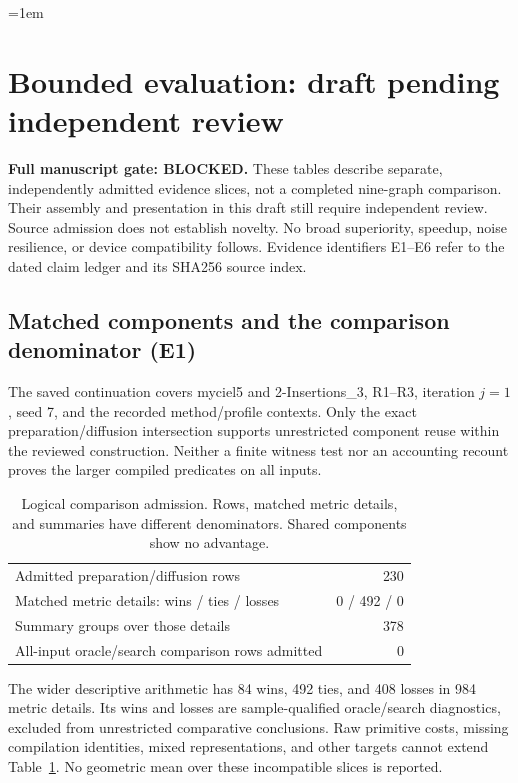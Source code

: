\begingroup
\emergencystretch=1em
\section{Bounded evaluation: draft pending independent review}
\label{sec:bounded-evaluation}
\textbf{Full manuscript gate: BLOCKED.} These tables describe separate,
independently admitted evidence slices, not a completed nine-graph comparison.
Their assembly and presentation in this draft still require independent review.
Source admission does not establish novelty. No broad superiority, speedup,
noise resilience, or device compatibility follows. Evidence identifiers E1--E6
refer to the dated claim ledger and its SHA256 source index.

\subsection{Matched components and the comparison denominator (E1)}
The saved continuation covers myciel5 and 2-Insertions\_3, R1--R3, iteration
$j=1$, seed 7, and the recorded method/profile contexts. Only the exact
preparation/diffusion intersection supports unrestricted component reuse within
the reviewed construction. Neither a finite witness test nor an accounting
recount proves the larger compiled predicates on all inputs.
\begin{table}[t]
\caption{Logical comparison admission. Rows, matched metric details, and
summaries have different denominators. Shared components show no advantage.}
\label{tab:bounded-comparison}
\centering\small
\begin{tabular}{lr}\toprule
Admitted preparation/diffusion rows & 230\\
Matched metric details: wins / ties / losses & 0 / 492 / 0\\
Summary groups over those details & 378\\
All-input oracle/search comparison rows admitted & 0\\\bottomrule
\end{tabular}
\end{table}
The wider descriptive arithmetic has 84 wins, 492 ties, and 408 losses in
984 metric details. Its wins and losses are sample-qualified oracle/search
diagnostics, excluded from unrestricted comparative conclusions. Raw primitive
costs, missing compilation identities, mixed representations, and other targets
cannot extend Table~\ref{tab:bounded-comparison}. No geometric mean over these
incompatible slices is reported.

